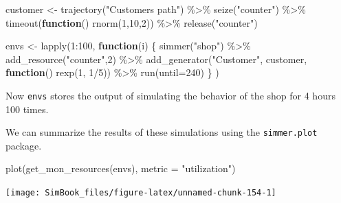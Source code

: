 \documentclass[
]{book}
\newenvironment{Shaded}{\begin{snugshade}}{\end{snugshade}}
\newcommand{\AttributeTok}[1]{\textcolor[rgb]{0.77,0.63,0.00}{#1}}
\newcommand{\ControlFlowTok}[1]{\textcolor[rgb]{0.13,0.29,0.53}{\textbf{#1}}}
\newcommand{\DecValTok}[1]{\textcolor[rgb]{0.00,0.00,0.81}{#1}}
\newcommand{\FunctionTok}[1]{\textcolor[rgb]{0.00,0.00,0.00}{#1}}
\newcommand{\NormalTok}[1]{#1}
\newcommand{\OtherTok}[1]{\textcolor[rgb]{0.56,0.35,0.01}{#1}}
\newcommand{\SpecialCharTok}[1]{\textcolor[rgb]{0.00,0.00,0.00}{#1}}
\newcommand{\StringTok}[1]{\textcolor[rgb]{0.31,0.60,0.02}{#1}}
\begin{document}
\begin{Shaded}
\begin{Highlighting}[]
\NormalTok{customer }\OtherTok{\textless{}{-}}
  \FunctionTok{trajectory}\NormalTok{(}\StringTok{"Customer\textquotesingle{}s path"}\NormalTok{) }\SpecialCharTok{\%\textgreater{}\%}
  \FunctionTok{seize}\NormalTok{(}\StringTok{"counter"}\NormalTok{) }\SpecialCharTok{\%\textgreater{}\%}
  \FunctionTok{timeout}\NormalTok{(}\ControlFlowTok{function}\NormalTok{() }\FunctionTok{rnorm}\NormalTok{(}\DecValTok{1}\NormalTok{,}\DecValTok{10}\NormalTok{,}\DecValTok{2}\NormalTok{)) }\SpecialCharTok{\%\textgreater{}\%}
  \FunctionTok{release}\NormalTok{(}\StringTok{"counter"}\NormalTok{) }


\NormalTok{envs }\OtherTok{\textless{}{-}} \FunctionTok{lapply}\NormalTok{(}\DecValTok{1}\SpecialCharTok{:}\DecValTok{100}\NormalTok{, }\ControlFlowTok{function}\NormalTok{(i) \{}
    \FunctionTok{simmer}\NormalTok{(}\StringTok{"shop"}\NormalTok{) }\SpecialCharTok{\%\textgreater{}\%} 
    \FunctionTok{add\_resource}\NormalTok{(}\StringTok{"counter"}\NormalTok{,}\DecValTok{2}\NormalTok{) }\SpecialCharTok{\%\textgreater{}\%}
    \FunctionTok{add\_generator}\NormalTok{(}\StringTok{"Customer"}\NormalTok{, customer, }\ControlFlowTok{function}\NormalTok{() }\FunctionTok{rexp}\NormalTok{(}\DecValTok{1}\NormalTok{, }\DecValTok{1}\SpecialCharTok{/}\DecValTok{5}\NormalTok{)) }\SpecialCharTok{\%\textgreater{}\%}
    \FunctionTok{run}\NormalTok{(}\AttributeTok{until=}\DecValTok{240}\NormalTok{)}
\NormalTok{\}}
\NormalTok{)}
\end{Highlighting}
\end{Shaded}

Now \texttt{envs} stores the output of simulating the behavior of the shop for 4 hours 100 times.

We can summarize the results of these simulations using the \texttt{simmer.plot} package.

\begin{Shaded}
\begin{Highlighting}[]
\FunctionTok{plot}\NormalTok{(}\FunctionTok{get\_mon\_resources}\NormalTok{(envs), }\AttributeTok{metric =} \StringTok{"utilization"}\NormalTok{)}
\end{Highlighting}
\end{Shaded}

\begin{center}\texttt{[image: SimBook\_files/figure-latex/unnamed-chunk-154-1]} \end{center}
\end{document}
